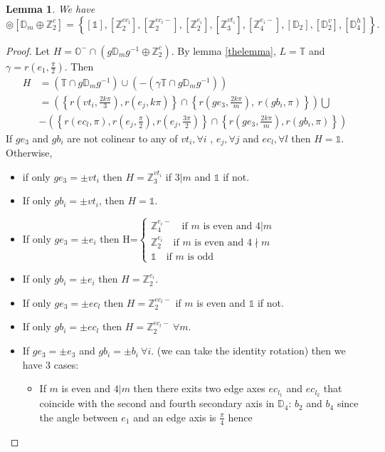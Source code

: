 \documentclass[11pt,a4paper]{amsart}
\newtheorem{lem}[thm]{Lemma}
\theoremstyle{definition}
\newcommand{\ZZ}{\mathbb{Z}}                %
\newcommand{\octa}{\mathbb{O}}              %
\newcommand{\tetra}{\mathbb{T}}             %
\newcommand{\DD}{\mathbb{D}}                %
\newcommand{\1}{\mathds{1}}		            %
\newcommand{\set}[1]{\left\{#1\right\}}     %
\begin{document}
\begin{lem}
We have
	\begin{equation*}
	[\octa^-] \circledcirc [\DD_m \oplus\ZZ_2^c]=\set{[\1],[\ZZ_{2}^{ec_l}],[\ZZ_{2}^{ec_l-}],[\ZZ_{2}^{e_i}],[\ZZ_3^{vt_i}],[\ZZ_{4}^{e_i-}],
[\DD_2],[\DD_2^v],[\DD_4^h]}.
	\end{equation*}
\end{lem}
\begin{proof}
	Let $H=\octa^-\cap (g\DD_m g^{-1} \oplus \ZZ_2^c)$.
	By lemma \ref{thelemma}, $L=\tetra$ and $\gamma=r(e_1,\frac{\pi}{2})$. Then
	\begin{align*}
	H&=(\tetra \cap g \DD_m g^{-1})\cup (-(\gamma\tetra\cap g \DD_m g^{-1}))\\
	&=\left(\set{r(vt_i,\frac{2k\pi}{3}),r(e_j,k\pi)}\cap \set{r(ge_3,\frac{2k\pi}{m}),\ r(gb_i,\pi)}\right)\bigcup\\
	&-\left(\set{r(ec_l,\pi),r(e_j,\frac{\pi}{2}),r(e_j,\frac{3\pi}{2})}\cap \set{r(ge_3,\frac{2k\pi}{m}),r(gb_i,\pi)}\right)
	\end{align*}
	If $ge_3$ and $gb_i$ are not colinear to any of $vt_i,\forall i$ , $e_j, \forall j$ and $ec_l, \forall l$ then $H=\1$.\\
	Otherwise,
	\begin{itemize}
		\item if only $ge_3=\pm vt_i$ then $H= \ZZ_3^{vt_i}$ if $3|m$ and $ \1$ if not.
		\item If only $gb_i=\pm vt_i$, then $H=\1$.
		\item If only $ge_3=\pm e_i$ then
		H=$
		\begin{cases}
		\ZZ_4^{e_i-} \quad \text{if } m \text{ is even and } 4|m\\
		\ZZ_2^{e_i} \quad \text{if } m \text{ is even and } 4\nmid m\\
		\1 \quad \text{if } m \text{ is odd}
		\end{cases}$
		\item If only $gb_i=\pm e_i$ then $H=\ZZ_2^{e_i}$.
		\item If only $ge_3=\pm ec_l$ then $H=\ZZ_2^{ec_l-}$ if $m$ is even and $\1$ if not.
		\item If only $gb_i=\pm ec_l$ then $H=\ZZ_2^{ec_l-} \ \forall m$.
		\item If $ge_3=\pm e_3$ and $gb_i=\pm b_i \ \forall i$. (we can take the identity rotation) then we have 3 cases:
		\begin{itemize}
	\item If $m$ is even and $4|m$ then there exits two edge axes $ec_{l_1}$ and $ec_{l_2}$ that coincide with the second and fourth secondary axis in $\DD_4$: $b_2$ and $b_4$ since the angle between $e_1$ and an edge axis is $\frac{\pi}{4}$ hence

\end{itemize}
\end{itemize}
\end{proof}
\end{document}
